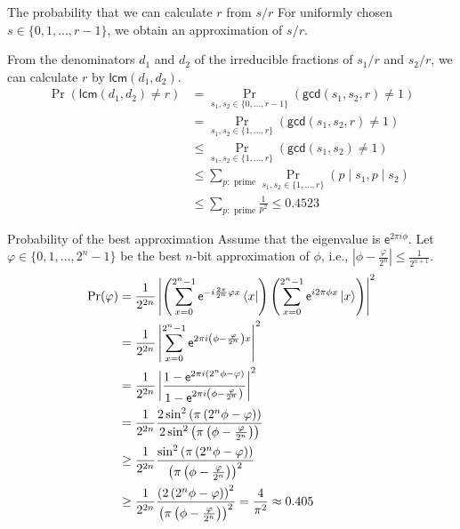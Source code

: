 \documentclass{beamer}
\newcommand\emm[1]{\textcolor{redorange}{{#1}}}
\begin{document}
\begin{frame}{The probability that we can calculate $r$ from $s/r$}
For uniformly chosen $s\in\{0,1,\dotsc,r-1\}$, we obtain an approximation of $s/r$.


\vspace{1em}
From the denominators $d_1$ and $d_2$ of the irreducible fractions of $s_1/r$ and $s_2/r$, 
we can calculate $r$ by $\mathsf{lcm}(d_1, d_2)$.
\begin{align*}
\Pr(\mathsf{lcm}(d_1, d_2) \ne r) &= \Pr_{s_1,s_2\in\{0,\dotsc,r-1\}}(\mathsf{gcd}(s_1,s_2,r) \ne 1)\\
&= \Pr_{s_1,s_2\in\{1,\dotsc,r\}}(\mathsf{gcd}(s_1,s_2,r) \ne 1)\\
&\le \Pr_{s_1,s_2\in\{1,\dotsc,r\}}(\mathsf{gcd}(s_1,s_2) \ne 1)\\
&\le \sum_{p: \text{ prime}} \Pr_{s_1,s_2\in\{1,\dotsc,r\}}(p\mid s_1, p\mid s_2)\\
&\le \sum_{p: \text{ prime}} \frac1{p^2}
\le 0.4523
\end{align*}
\end{frame}

\begin{frame}{Probability of the best approximation}
\small
Assume that the eigenvalue is $\mathsf{e}^{2\pi i\phi}$.
Let $\varphi\in\{0,1,\dotsc,2^n-1\}$ be the best $n$-bit approximation of $\phi$, i.e., \emm{$|\phi - \frac{\varphi}{2^n}|\le \frac1{2^{n+1}}$}.
\begin{align*}
\Pr(\varphi) &= \frac1{2^{2n}}\left|\left(\sum_{x=0}^{2^n-1} \mathsf{e}^{-i\frac{2\pi}{2^n}\varphi x}\bra{x}\right)\left(\sum_{x=0}^{2^n-1} \mathsf{e}^{i 2\pi\phi x}\ket{x}\right)\right|^2\\
&= \frac1{2^{2n}}\left|\sum_{x=0}^{2^n-1} \mathsf{e}^{2\pi i\left(\phi - \frac{\varphi}{2^n}\right) x}\right|^2\\
&= \frac1{2^{2n}}\left|\frac{1-\mathsf{e}^{2\pi i\left(2^n\phi - \varphi\right)}}{1-\mathsf{e}^{2\pi i\left(\phi - \frac{\varphi}{2^n}\right)}}\right|^2\\
&= \frac1{2^{2n}}\frac{2\sin^2\left(\pi\left(2^n\phi - \varphi\right)\right)}{2\sin^2\left(\pi\left(\phi - \frac{\varphi}{2^n}\right)\right)}\\
&\ge \frac1{2^{2n}}\frac{\sin^2\left(\pi\left(2^n\phi - \varphi\right)\right)}{\left(\pi\left(\phi - \frac{\varphi}{2^n}\right)\right)^2}\\
&\ge \frac1{2^{2n}}\frac{\left(2\left(2^n\phi - \varphi\right)\right)^2}{\left(\pi\left(\phi - \frac{\varphi}{2^n}\right)\right)^2}
= \frac{4}{\pi^2}\approx 0.405
\end{align*}
\end{frame}
\fi
\end{document}

